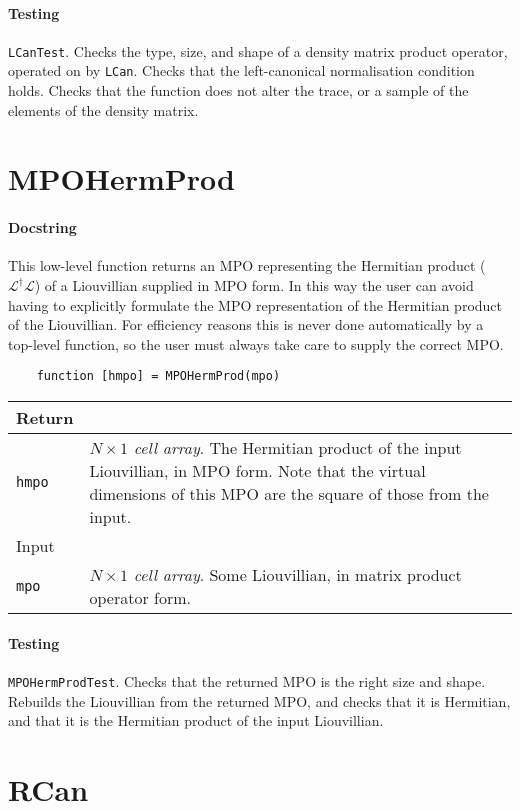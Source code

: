  \paragraph{Testing} \lstinline$LCanTest$. Checks the type, size, and shape of a density matrix product operator, operated on by \lstinline$LCan$. Checks that the left-canonical normalisation condition holds. Checks that the function does not alter the trace, or a sample of the elements of the density matrix.

 \section{MPOHermProd}
 \paragraph{Docstring} This low-level function returns an MPO representing the Hermitian product (\(\mathcal{L}^{\dagger}\mathcal{L}\)) of a Liouvillian supplied in MPO form. In this way the user can avoid having to explicitly formulate the MPO representation of the Hermitian product of the Liouvillian. For efficiency reasons this is never done automatically by a top-level function, so the user must always take care to supply the correct MPO.
 \begin{lstlisting}
 	function [hmpo] = MPOHermProd(mpo) \end{lstlisting}
 \begin{longtabu}{X[1,1]X[4,1]}
 \hline
 Return & \\ \hline
 \lstinline$hmpo$ & \emph{\(N \times 1\) cell array}. The Hermitian product of the input Liouvillian, in MPO form. Note that the virtual dimensions of this MPO are the square of those from the input. \\ \hline
 Input & \\ \hline
 \lstinline$mpo$ & \emph{\(N \times 1\) cell array}. Some Liouvillian, in matrix product operator form. \\
 \hline
 \end{longtabu}
 \paragraph{Testing} \lstinline$MPOHermProdTest$. Checks that the returned MPO is the right size and shape. Rebuilds the Liouvillian from the returned MPO, and checks that it is Hermitian, and that it is the Hermitian product of the input Liouvillian.

 \section{RCan}
